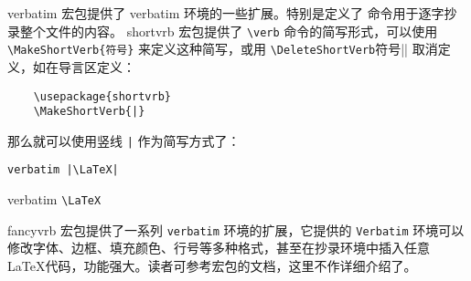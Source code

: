 verbatim 宏包提供了 verbatim 环境的一些扩展。特别是定义了 \verb|| 命令用于逐字抄录整个文件的内容。 shortvrb 宏包提供了 \verb|\verb| 命令的简写形式，可以使用\verb|\MakeShortVerb{符号}| 来定义这种简写，或用 \verb|\DeleteShortVerb|符号|| 取消定义，如在导言区定义：
\begin{lstlisting}
    \usepackage{shortvrb}
    \MakeShortVerb{|}
\end{lstlisting}
那么就可以使用竖线 \lstinline{|} 作为简写方式了：

\begin{minipage}[t]{0.45\textwidth}
\begin{lstlisting}
verbatim |\LaTeX|
\end{lstlisting}
\end{minipage}
\hfill
\begin{minipage}[t]{0.45\textwidth}
    verbatim \verb|\LaTeX|
\end{minipage}

fancyvrb 宏包提供了一系列 \verb|verbatim| 环境的扩展，它提供的 \verb|Verbatim| 环境可以修改字体、边框、填充颜色、行号等多种格式，甚至在抄录环境中插入任意 \LaTeX 代码，功能强大。读者可参考宏包的文档，这里不作详细介绍了。

